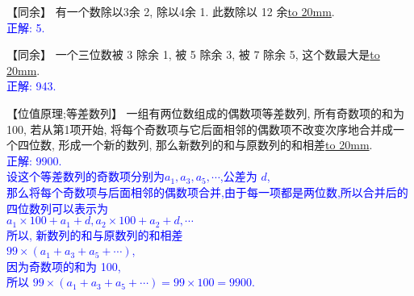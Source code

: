 \item {
    【同余】
    有一个数除以3余 2, 除以4余 1. 此数除以 12 余\underline{\hbox to 20mm{}}.
    \ifshowSolution
        \\\fangsong{}\textcolor{blue}{
            正解: 5.
        }
    \else
        \vspace{1cm}
    \fi
}

\item {
    【同余】
    一个三位数被 3 除余 1, 被 5 除余 3, 被 7 除余 5, 这个数最大是\underline{\hbox to 20mm{}}.
    \ifshowSolution
        \\\fangsong{}\textcolor{blue}{
            正解: 943.
        }
    \else
        \vspace{1cm}
    \fi
}

\item {
    【位值原理;等差数列】
    一组有两位数组成的偶数项等差数列, 所有奇数项的和为100, 若从第1项开始, 将每个奇数项与它后面相邻的偶数项不改变次序地合并成一个四位数, 形成一个新的数列, 那么新数列的和与原数列的和相差\underline{\hbox to 20mm{}}.
    \ifshowSolution
        \\\fangsong{}\textcolor{blue}{
            正解: 9900.\\
            设这个等差数列的奇数项分别为$a_1,a_3,a_5,\cdots$,公差为 $d$,\\
            那么将每个奇数项与后面相邻的偶数项合并,由于每一项都是两位数,所以合并后的四位数列可以表示为\\
            $a_1\times 100 + a_1+d, a_2\times 100 + a_2 + d,\cdots$\\
            所以, 新数列的和与原数列的和相差\\
            $99\times (a_1+a_3+a_5+\cdots)$,\\
            因为奇数项的和为 100, \\
            所以 $99\times (a_1+a_3+a_5+\cdots) = 99\times 100 = 9900$.
        }
    \else
        \vspace{1cm}
    \fi
}

